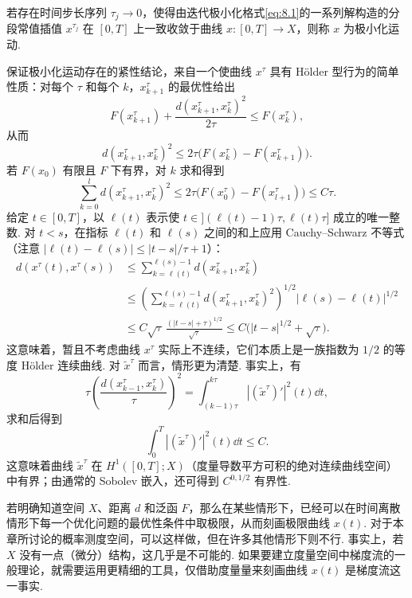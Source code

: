 \begin{definition}\label{obj:8.3}
若存在时间步长序列 $\tau_j\to0$，使得由迭代极小化格式\eqref{eq:8.1}的一系列解构造的分段常值插值 $x^{\tau_j}$ 在 $[0,T]$ 上一致收敛于曲线 $x:[0,T]\to X$，则称 $x$ 为极小化运动.
\end{definition}

保证极小化运动存在的紧性结论，来自一个使曲线 $x^\tau$ 具有 Hölder 型行为的简单性质：对每个 $\tau$ 和每个 $k$，$x_{k+1}^\tau$ 的最优性给出
\begin{equation}\label{eq:8.2}
F(x_{k+1}^\tau)+\frac{d(x_{k+1}^\tau,x_k^\tau)^2}{2\tau}\leq F(x_k^\tau),
\end{equation}
从而
\[
d(x_{k+1}^\tau,x_k^\tau)^2\leq2\tau\bigl(F(x_k^\tau)-F(x_{k+1}^\tau)\bigr).
\]
若 $F(x_0)$ 有限且 $F$ 下有界，对 $k$ 求和得到
\[
\sum_{k=0}^l d(x_{k+1}^\tau,x_k^\tau)^2
\leq2\tau\bigl(F(x_0^\tau)-F(x_{l+1}^\tau)\bigr)\leq C\tau.
\]
给定 $t\in[0,T]$，以 $\ell(t)$ 表示使 $t\in ](\ell(t)-1)\tau,\ell(t)\tau]$ 成立的唯一整数. 对 $t<s$，在指标 $\ell(t)$ 和 $\ell(s)$ 之间的和上应用 Cauchy--Schwarz 不等式（注意 $|\ell(t)-\ell(s)|\leq |t-s|/\tau+1$）：
\[
\begin{aligned}
d(x^\tau(t),x^\tau(s))
&\leq\sum_{k=\ell(t)}^{\ell(s)-1}d(x_{k+1}^\tau,x_k^\tau)\\
&\leq\left(\sum_{k=\ell(t)}^{\ell(s)-1}d(x_{k+1}^\tau,x_k^\tau)^2\right)^{1/2}
|\ell(s)-\ell(t)|^{1/2}\\
&\leq C\sqrt\tau\,\frac{(|t-s|+\tau)^{1/2}}{\sqrt\tau}
\leq C\bigl(|t-s|^{1/2}+\sqrt\tau\bigr).
\end{aligned}
\]
这意味着，暂且不考虑曲线 $x^\tau$ 实际上不连续，它们本质上是一族指数为 $1/2$ 的等度 Hölder 连续曲线. 对 $\widetilde x^\tau$ 而言，情形更为清楚. 事实上，有
\[
\tau\left(\frac{d(x_{k-1}^\tau,x_k^\tau)}{\tau}\right)^2
=\int_{(k-1)\tau}^{k\tau}|(\widetilde x^\tau)'|^2(t)\dd t,
\]
求和后得到
\[
\int_0^T |(\widetilde x^\tau)'|^2(t)\dd t\leq C.
\]
这意味着曲线 $\widetilde x^\tau$ 在 $H^1([0,T];X)$（度量导数平方可积的绝对连续曲线空间）中有界；由通常的 Sobolev 嵌入，还可得到 $C^{0,1/2}$ 有界性.

若明确知道空间 $X$、距离 $d$ 和泛函 $F$，那么在某些情形下，已经可以在时间离散情形下每一个优化问题的最优性条件中取极限，从而刻画极限曲线 $x(t)$. 对于本章所讨论的概率测度空间，可以这样做，但在许多其他情形下则不行. 事实上，若 $X$ 没有一点（微分）结构，这几乎是不可能的. 如果要建立度量空间中梯度流的一般理论，就需要运用更精细的工具，仅借助度量量来刻画曲线 $x(t)$ 是梯度流这一事实.

